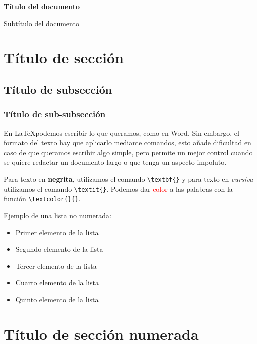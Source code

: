 \documentclass[10pt, a4paper, landscape]{article}
\begin{document}
	\begin{multicols}{3}
		\begin{center}
			\textbf{\LARGE Título del documento}
			
			{\footnotesize Subtítulo del documento}
		\end{center}
		
		\section*{Título de sección}

        \subsection*{Título de subsección}

        \subsubsection*{Título de sub-subsección}
        
        En \LaTeX podemos escribir lo que queramos, como en Word. Sin embargo, el formato del texto hay que aplicarlo mediante comandos, esto añade dificultad en caso de que queramos escribir algo simple, pero permite un mejor control cuando se quiere redactar un documento largo o que tenga un aspecto impoluto.
        
        Para texto en \textbf{negrita}, utilizamos el comando \verb|\textbf{}|  y para texto en \textit{cursiva} utilizamos el comando \verb|\textit{}|. Podemos dar \textcolor{red}{color} a las palabras con la función \verb|\textcolor{}{}|.

        Ejemplo de una lista no numerada:
		
		\begin{itemize}[leftmargin=*]
			\item Primer elemento de la lista
			\item Segundo elemento de la lista
            \item Tercer elemento de la lista
            \item Cuarto elemento de la lista
            \item Quinto elemento de la lista
		\end{itemize}

    \columnbreak

        \section{Título de sección numerada}
        

\end{multicols}
\end{document}
